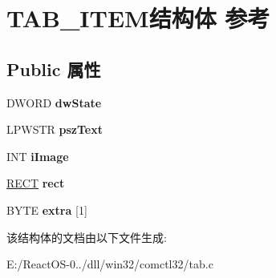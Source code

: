 \hypertarget{struct_t_a_b___i_t_e_m}{}\section{T\+A\+B\+\_\+\+I\+T\+E\+M结构体 参考}
\label{struct_t_a_b___i_t_e_m}
\subsection*{Public 属性}
\begin{DoxyCompactItemize}
\item 
\mbox{\label{struct_t_a_b___i_t_e_m_a606fac4650a8acd151cc597e61a22a30}} 
D\+W\+O\+RD {\bfseries dw\+State}
\item 
\mbox{\label{struct_t_a_b___i_t_e_m_a2557ba8a6b41f465e675aac6a01b4673}} 
L\+P\+W\+S\+TR {\bfseries psz\+Text}
\item 
\mbox{\label{struct_t_a_b___i_t_e_m_a428a0f73ecf523e5a50449d0408021a5}} 
I\+NT {\bfseries i\+Image}
\item 
\mbox{\label{struct_t_a_b___i_t_e_m_a86b7bed1792650559db7defd24250bf1}} 
\hyperlink{structtag_r_e_c_t}{R\+E\+CT} {\bfseries rect}
\item 
\mbox{\label{struct_t_a_b___i_t_e_m_a19240821ccfee6f3710d198f984dd0bd}} 
B\+Y\+TE {\bfseries extra} \mbox{[}1\mbox{]}
\end{DoxyCompactItemize}


该结构体的文档由以下文件生成\+:\begin{DoxyCompactItemize}
\item 
E\+:/\+React\+O\+S-\/0../dll/win32/comctl32/tab.\+c\end{DoxyCompactItemize}
